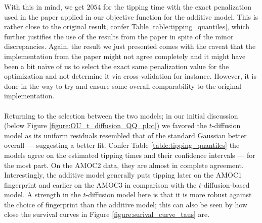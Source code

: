 With this in mind, we get $2054$ for the tipping time with the exact penalization used in the paper applied in our objective function for the additive model. This is rather close to the original result, confer Table \ref{table:tipping_quantiles}, which further justifies the use of the results from the paper in spite of the minor discrepancies. Again, the result we just presented comes with the caveat that the implementation from the paper might not agree completely and it might have been a bit naïve of us to select the exact same penalization value for the optimization and not determine it via cross-validation for instance. However, it is done in the way to try and ensure some overall comparability to the original implementation.\\\\
Returning to the selection between the two models; in our initial discussion (below Figure \ref{figure:OU_t_diffusion_QQ_plot}) we favored the $t$-diffusion model as its uniform residuals resembled that of the standard Gaussian better overall — suggesting a better fit. Confer Table \ref{table:tipping_quantiles} the models agree on the estimated tipping times and their confidence intervals — for the most part. On the AMOC2 data, they are almost in complete agreement. Interestingly, the additive model generally puts tipping later on the AMOC1 fingerprint and earlier on the AMOC3 in comparison with the $t$-diffusion-based model. A strength in the $t$-diffusion model here is that it is more robust against the choice of fingerprint than the additive model; this can also be seen by how close the survival curves in Figure \ref{figure:surival_curve_taus} are.

